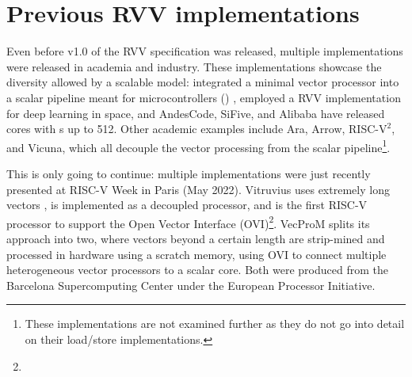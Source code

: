 \section{Previous RVV implementations\label{chap:bg:rvvend}}
Even before v1.0 of the RVV specification was released, multiple implementations were released in academia and industry.
These implementations showcase the diversity allowed by a scalable model: \citeauthor{johnsMinimalRISCVVector2020} integrated a minimal vector processor into a scalar pipeline meant for microcontrollers () \cite{johnsMinimalRISCVVector2020}, \citeauthor{dimascioOnBoardDecisionMaking2021} employed a RVV implementation for deep learning in space\cite{dimascioOnBoardDecisionMaking2021}, and AndesCode, SiFive, and Alibaba have released cores with s up to 512\cite{AndesCoreNX27VProcessor}\cite{chenXuantie910CommercialMultiCore2020}.
Other academic examples include Ara\cite{cavalcanteAra1GHzScalable2020}, Arrow\cite{assirArrowRISCVVector2021}, RISC-$\text{V}^2$\cite{patsidisRISCV2ScalableRISCV2020}, and Vicuna\cite{platzerVicunaTimingPredictableRISCV2021}, which all decouple the vector processing from the scalar pipeline\footnote{These implementations are not examined further as they do not go into detail on their load/store implementations.}.

This is only going to continue: multiple implementations were just recently presented at RISC-V Week in Paris (May 2022).
Vitruvius\cite{minerviniVitruviusAreaEfficientRISCV2022} uses extremely long vectors , is implemented as a decoupled processor, and is the first RISC-V processor to support the Open Vector Interface (OVI)\footnote{}.
VecProM\cite{mahaleRISCVVPUVery2021} splits its approach into two, where vectors beyond a certain length are strip-mined and processed in hardware using a scratch memory, using OVI to connect multiple heterogeneous vector processors to a scalar core.
Both were produced from the Barcelona Supercomputing Center under the European Processor Initiative.

